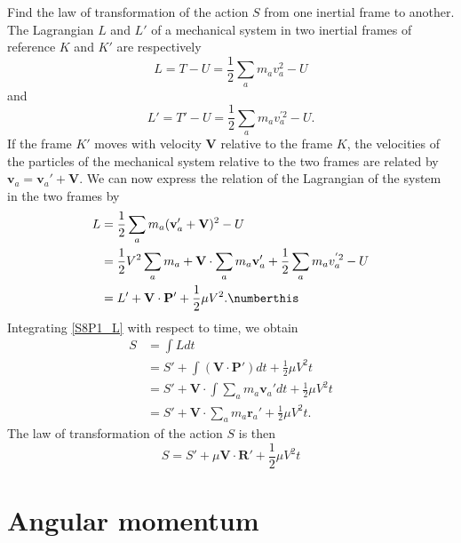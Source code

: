 
\begin{problem}[title={Action transformed between inertial frames}]
{
Find the law of transformation of the action $S$ from one inertial frame to another.
}
{
The Lagrangian $L$ and $L'$ of a mechanical system in two inertial frames of reference $K$ and $K'$ are respectively
\begin{equation*}
    L = T - U = \frac{1}{2} \sum_a m_a v_a^2 - U
\end{equation*}
and
\begin{equation*}
    L' = T' - U = \frac{1}{2} \sum_a m_a v_a^{'2} - U.
\end{equation*}
If the frame $K'$ moves with velocity $\mathbf{V}$ relative to the frame $K$, the velocities of the particles of the mechanical system relative to the two frames are related by $\mathbf{v}_a = \mathbf{v}_a' + \mathbf{V}$. We can now express the relation of the Lagrangian of the system in the two frames by
\begin{align*}
    L &= \frac{1}{2} \sum_a m_a (\mathbf{v}_a' + \mathbf{V})^2 - U \\ 
    &= \frac{1}{2} V^2 \sum_a m_a + \mathbf{V} \cdot \sum_a m_a \mathbf{v}_a' + \frac{1}{2} \sum_a m_a v_a^{'2} - U \\
    &= L' + \mathbf{V} \cdot \mathbf{P}' + \frac{1}{2} \mu V^2 . \numberthis \label{S8P1_L}
\end{align*}
Integrating \eqref{S8P1_L} with respect to time, we obtain
\begin{align*}
    S &= \int L dt \\
    &= S' + \int \left( \mathbf{V} \cdot \mathbf{P}' \right)dt + \frac{1}{2} \mu V^2 t \\
    &= S' + \mathbf{V} \cdot \int \sum_a m_a \mathbf{v}_a' dt + \frac{1}{2} \mu V^2 t \\
    &= S' + \mathbf{V} \cdot \sum_a m_a \mathbf{r}_a' + \frac{1}{2} \mu V^2 t .
\end{align*}
The law of transformation of the action $S$ is then
}
{
\begin{equation*}
    S = S' + \mu \mathbf{V} \cdot \mathbf{R}' + \frac{1}{2} \mu V^2 t
\end{equation*}
}
\end{problem}

\section{Angular momentum}

